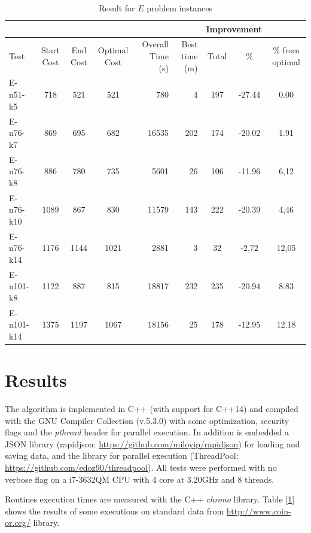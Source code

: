 \documentclass[twoside]{article}
\begin{document}
\begin{multicols}{2}
\begin{table}[ht]
	\caption{Result for \emph{$E$} problem instances}
	\label{tb:res}
	\hspace*{-2cm}\begin{tabular}{l||cccrr||cc|c} 
		\hline
		& & & & & & \multicolumn{2}{c|}{Improvement} \\
		\toprule
		Test & Start Cost & End Cost & Optimal Cost & Overall Time (s) & Best time (m) & Total & \% & \% from optimal \\
		\midrule
		E-n51-k5 & 718 & 521 & 521 & 780 & 4 & 197 & -27.44 & 0.00 \\
		\rowcolor{Gray}
		E-n76-k7 & 869 & 695 & 682 & 16535 & 202 & 174 & -20.02 & 1.91 \\
		E-n76-k8 & 886 & 780 & 735 & 5601 & 26 & 106 & -11.96 & 6,12 \\
		\rowcolor{Gray}
		E-n76-k10 & 1089 & 867 & 830 & 11579 & 143 & 222 & -20.39 & 4,46 \\
		E-n76-k14 & 1176 & 1144 & 1021 & 2881 & 3 & 32 & -2,72 & 12,05 \\
		\rowcolor{Gray}
		E-n101-k8 & 1122 & 887 & 815 & 18817 & 232 & 235 & -20.94 & 8.83 \\
		E-n101-k14 & 1375 & 1197 & 1067 & 18156 & 25 & 178 & -12.95 & 12.18 \\
		\bottomrule
	\end{tabular}
\end{table}

\section{Results}
The algorithm is implemented in C++ (with support for C++14) and compiled with the GNU Compiler Collection (v.5.3.0) with some optimization, security flags and the \textit{pthread} header for parallel execution.
In addition is embedded a JSON library (rapidjson: \url{https://github.com/miloyip/rapidjson}) for loading and saving data, and the library for parallel execution (ThreadPool: \url{https://github.com/edoz90/threadpool}).\newline
All tests were performed with no verbose flag on a i7-3632QM CPU with 4 core at 3.20GHz and 8 threads.

Routines execution times are measured with the C++ \textit{chrono} library.\newline
Table [\ref{tb:res}] shows the results of some executions on standard data from \url{http://www.coin-or.org/} library.



\end{multicols}
\end{document}
